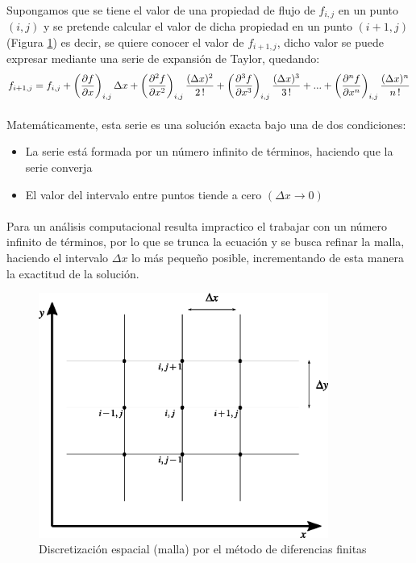 \documentclass[letterpaper, openright, 12pt]{book}
\begin{document}
	\paragraph*{}
	Supongamos que se tiene el valor de una propiedad de flujo de $f_{i,j}$ en un punto $(i,j)$ y se pretende calcular el valor de dicha propiedad en un punto $(i+1,j)$ (Figura \ref{malla-DF1}) es decir, se quiere conocer el valor de $f_{i+1,j}$, dicho valor se puede expresar mediante una serie de expansión de Taylor, quedando:
	\begin{equation}
	f_{i+1,j} = f_{i,j} + \left(\pdv{f}{x} \right)_{i,j} \Delta x + \left( \pdv[2]{f}{x} \right)_{i,j} \frac{(\Delta x)^2}{2\,!} + \left(\pdv[3]{f}{x} \right)_{i,j} \frac{ (\Delta x)^3 }{3\,!} + ... + \left( \pdv[n]{f}{x} \right)_{i,j} \frac{ (\Delta x)^n }{n\,!}
	\label{taylor-forward}
	\end{equation}
	
	\paragraph*{}
	Matemáticamente, esta serie es una solución exacta bajo una de dos condiciones:
	\begin{itemize}
		\item La serie está formada por un número infinito de términos, haciendo que la serie converja
		\item El valor del intervalo entre puntos tiende a cero $(\Delta x \rightarrow 0)$
	\end{itemize}
	
	\paragraph*{}
	Para un análisis computacional resulta impractico el trabajar con un número infinito de términos, por lo que se trunca la ecuación y se busca refinar la malla, haciendo el intervalo $\Delta x$ lo más pequeño posible, incrementando de esta manera la exactitud de la solución.
	
	\begin{figure}[htbp!]
		\centering
		\includegraphics[width=95mm]{./Imagenes/malla-DF1}
		\caption[Discretización por Diferencias Finitas]{Discretización espacial (malla) por el método de diferencias finitas \cite{anderson-yotros}}
		\label{malla-DF1}
	\end{figure}
	
\end{document}
